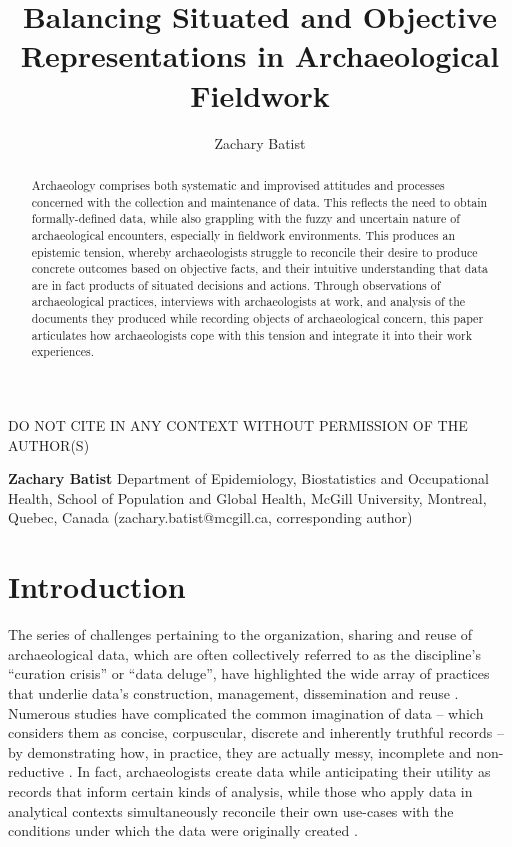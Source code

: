 \documentclass{article}
\begin{document}
\title{Balancing Situated and Objective Representations in Archaeological Fieldwork}
\author{Zachary Batist}
\date{}
\maketitle

\begin{center}
  DO NOT CITE IN ANY CONTEXT WITHOUT PERMISSION OF THE AUTHOR(S)
\end{center}

\noindent\textbf{Zachary Batist} Department of Epidemiology, Biostatistics and Occupational Health, School of Population and Global Health, McGill University, Montreal, Quebec, Canada (zachary.batist@mcgill.ca, corresponding author)

\begin{abstract}
  Archaeology comprises both systematic and improvised attitudes and processes concerned with the collection and maintenance of data.
  This reflects the need to obtain formally-defined data, while also grappling with the fuzzy and uncertain nature of archaeological encounters, especially in fieldwork environments.
  This produces an epistemic tension, whereby archaeologists struggle to reconcile their desire to produce concrete outcomes based on objective facts, and their intuitive understanding that data are in fact products of situated decisions and actions.
  Through observations of archaeological practices, interviews with archaeologists at work, and analysis of the documents they produced while recording objects of archaeological concern, this paper articulates how archaeologists cope with this tension and integrate it into their work experiences.
\end{abstract}
\newpage

\section{Introduction}
The series of challenges pertaining to the organization, sharing and
reuse of archaeological data, which are often collectively referred to
as the discipline's ``curation crisis'' or ``data deluge'', have
highlighted the wide array of practices that underlie data's
construction, management, dissemination and reuse
\parencites{bevan2012a,huggett2022,huggett2022a}. Numerous studies have
complicated the common imagination of data -- which considers them as
concise, corpuscular, discrete and inherently truthful records -- by
demonstrating how, in practice, they are actually messy, incomplete and
non-reductive
\parencites[cf.][]{batist2024a,dallas2015,huggett2022a,voss2012}. In
fact, archaeologists create data while anticipating their utility as
records that inform certain kinds of analysis, while those who apply
data in analytical contexts simultaneously reconcile their own use-cases
with the conditions under which the data were originally created
\parencite[190-191]{dallas2015}.
\end{document}
